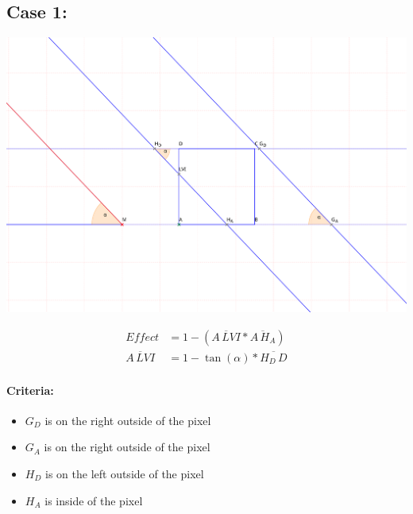\documentclass[a4paper,10pt,fleqn]{scrartcl}
\numberwithin{equation}{subsection}
\begin{document}
\subsection{Case 1:}
\begin{minipage}{\textwidth}
\includegraphics[width=\textwidth]{case1}
\end{minipage}
\begin{align}
Effect &= 1 - (\overline{A\,LVI} * \overline{A\,H_A})\\
\overline{A\,LVI} &=  1 - \tan(\alpha) * \overline{H_D\,D}
\end{align}
\paragraph{Criteria:}
\begin{itemize}
 \item $G_D$ is on the right outside of the pixel
 \item $G_A$ is on the right outside of the pixel
 \item $H_D$ is on the left outside of the pixel
 \item $H_A$ is inside of the pixel
\end{itemize}
\end{document}
